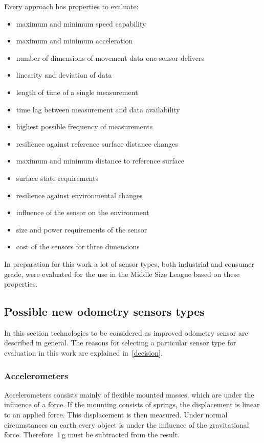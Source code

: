 \documentclass[12pt,a4paper]{article}
\newcommand{\MSL}{Middle Size League\xspace}
\begin{document}
Every approach has properties to evaluate:
\begin{itemize}
  \item maximum and minimum speed capability
  \item maximum and minimum acceleration
  \item number of dimensions of movement data one sensor delivers
  \item linearity and deviation of data
  \item length of time of a single measurement
  \item time lag between measurement and data availability
  \item highest possible frequency of measurements
  \item resilience against reference surface distance changes
  \item maximum and minimum distance to reference surface
  \item surface state requirements
  \item resilience against environmental changes
  \item influence of the sensor on the environment 
  \item size and power requirements of the sensor
  \item cost of the sensors for three dimensions
\end{itemize}

In preparation for this work a lot of sensor types, both industrial and consumer grade, were evaluated for the use in the \MSL based on these properties.


\subsection{Possible new odometry sensors types}

In this section technologies to be considered as improved odometry sensor are described in general.
The reasons for selecting a particular sensor type for evaluation in this work are explained in~\autoref{decision}.


\subsubsection{Accelerometers}

Accelerometers consists mainly of flexible mounted masses, which are under the influence of a force.
If the mounting consists of springs, the displacement is linear to an applied force.
This displacement is then measured.
Under normal circumstances on earth every object is under the influence of the gravitational force.
Therefore~1\,g must be subtracted from the result.
\end{document}
